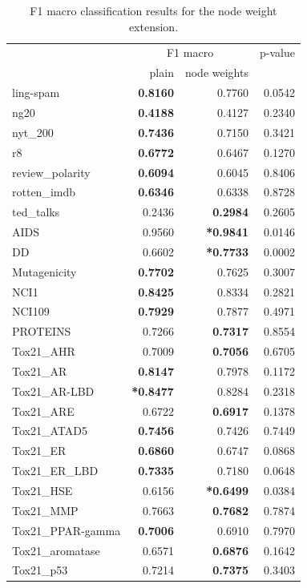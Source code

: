 \begin{table}[htb!]
	\centering
\begin{tabular}{lrrr}
	{} & \multicolumn{2}{c}{F1 macro} & {p-value} \\
	{} &  plain &  node weights &  \\
	\midrule
	ling-spam       & \textbf{0.8160} & 0.7760 & 0.0542 \\
	ng20            & \textbf{0.4188} & 0.4127 & 0.2340 \\
	nyt\_200         &\textbf{ 0.7436} & 0.7150 & 0.3421 \\
	r8              & \textbf{0.6772} & 0.6467 & 0.1270 \\
	review\_polarity & \textbf{0.6094} & 0.6045 & 0.8406 \\
	rotten\_imdb     & \textbf{0.6346} & 0.6338 & 0.8728 \\
	ted\_talks       & 0.2436 & \textbf{0.2984} & 0.2605 \\
	\midrule
	AIDS             & 0.9560 & \textbf{*0.9841} & 0.0146 \\
	DD               & 0.6602 & \textbf{*0.7733} & 0.0002 \\
	Mutagenicity     & \textbf{0.7702} & 0.7625 & 0.3007 \\
	NCI1             & \textbf{0.8425} & 0.8334 & 0.2821 \\
	NCI109           & \textbf{0.7929} & 0.7877 & 0.4971 \\
	PROTEINS         & 0.7266 & \textbf{0.7317} & 0.8554 \\
	Tox21\_AHR        & 0.7009 & \textbf{0.7056} & 0.6705 \\
	Tox21\_AR         & \textbf{0.8147} & 0.7978 & 0.1172 \\
	Tox21\_AR-LBD     & \textbf{*0.8477} & 0.8284 & 0.2318 \\
	Tox21\_ARE        & 0.6722 & \textbf{0.6917} & 0.1378 \\
	Tox21\_ATAD5      & \textbf{0.7456} & 0.7426 & 0.7449 \\
	Tox21\_ER         & \textbf{0.6860} & 0.6747 & 0.0868 \\
	Tox21\_ER\_LBD     & \textbf{0.7335} & 0.7180 & 0.0648 \\
	Tox21\_HSE        & 0.6156 & \textbf{*0.6499} & 0.0384 \\
	Tox21\_MMP        & 0.7663 & \textbf{0.7682} & 0.7874 \\
	Tox21\_PPAR-gamma & \textbf{0.7006} & 0.6910 & 0.7970 \\
	Tox21\_aromatase  & 0.6571 & \textbf{0.6876} & 0.1642 \\
	Tox21\_p53        & 0.7214 & \textbf{0.7375} & 0.3403 \\
	\bottomrule
\end{tabular}
\caption[Results: Classification using node weight WL extension]{F1 macro classification results for  the node weight extension.}\label{table:wl_node_weight_extension}
\end{table}

